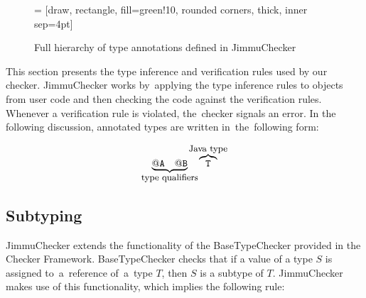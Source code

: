\documentclass{pracamgr}
\theoremstyle{break}
\theoremstyle{break}
\theoremstyle{break}
\begin{document}
\begin{figure}[pt]
  \centering
   = [draw, rectangle, fill=green!10, rounded corners, thick, inner sep=4pt]    
  \caption{Full hierarchy of type annotations defined in JimmuChecker}
  \label{fig:hierarchy}
\end{figure}

This section presents the type inference and verification rules used
by our checker. JimmuChecker works by~applying the type inference
rules to objects from user code and then checking the code against the
verification rules. Whenever a verification rule is violated,
the~checker signals an error. In the following discussion, annotated
types are written in~the~following form:

$$\underbrace{\mathtt{@A\quad @B}}_{\mathclap{\textrm{\small{type qualifiers}}}}\quad \overbrace{\mathtt{T}}^{\mathclap{\textrm{\small{Java type}}}}$$

\subsection{Subtyping}
\label{sec:chk:hierarchy}

JimmuChecker extends the functionality of the BaseTypeChecker
provided in the Checker Framework. BaseTypeChecker checks that if a
value of a type $S$ is assigned to~a~reference of~a~type $T$, then $S$
is a subtype of $T$. JimmuChecker makes use of this functionality,
which implies the following rule:
\end{document}
